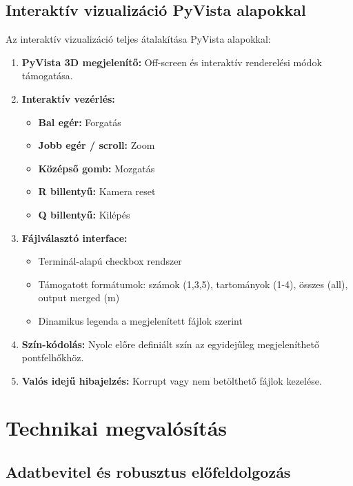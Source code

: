 \documentclass[12pt,a4paper]{article}
\begin{document}
\subsection{Interaktív vizualizáció PyVista alapokkal}

Az interaktív vizualizáció teljes átalakítása PyVista alapokkal:

\begin{enumerate}[nosep]
    \item \textbf{PyVista 3D megjelenítő:} Off-screen és interaktív renderelési módok támogatása.
    \item \textbf{Interaktív vezérlés:}
        \begin{itemize}
            \item \textbf{Bal egér:} Forgatás
            \item \textbf{Jobb egér / scroll:} Zoom
            \item \textbf{Középső gomb:} Mozgatás
            \item \textbf{R billentyű:} Kamera reset
            \item \textbf{Q billentyű:} Kilépés
        \end{itemize}
    \item \textbf{Fájlválasztó interface:}
        \begin{itemize}
            \item Terminál-alapú checkbox rendszer
            \item Támogatott formátumok: számok (1,3,5), tartományok (1-4), összes (all), output merged (m)
            \item Dinamikus legenda a megjelenített fájlok szerint
        \end{itemize}
    \item \textbf{Szín-kódolás:} Nyolc előre definiált szín az egyidejűleg megjeleníthető pontfelhőkhöz.
    \item \textbf{Valós idejű hibajelzés:} Korrupt vagy nem betölthető fájlok kezelése.
\end{enumerate}

\section{Technikai megvalósítás}

\subsection{Adatbevitel és robusztus előfeldolgozás}
\end{document}
